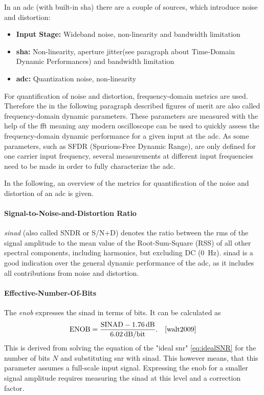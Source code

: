 In an \gls{adc} (with built-in \gls{sha}) there are a couple of sources, which introduce noise and distortion:
\begin{itemize}
	\item \textbf{Input Stage:} Wideband noise, non-linearity and bandwidth limitation
	\item \textbf{\gls{sha}:} Non-linearity, aperture jitter(see paragraph about Time-Domain Dynamic Performances)  and bandwidth limitation
	\item \textbf{\gls{adc}:} Quantization noise, non-linearity
\end{itemize}

For quantification of noise and distortion, frequency-domain metrics are used. 
Therefore the in the following paragraph described figures of merit are also called frequency-domain dynamic parameters. 
These parameters are measured with the help of the \gls{fft} meaning any modern oscilloscope can be used to quickly assess the frequency-domain dynamic performance for a given input at the \gls{adc}.
As some parameters, such as SFDR (Spurious-Free Dynamic Range), are only defined for one carrier input frequency, several measurements at different input frequencies need to be made in order to fully characterize the \gls{adc}.

In the following, an overview of the metrics for quantification of the noise and distortion of an \gls{adc} is given. 

\paragraph{Signal-to-Noise-and-Distortion Ratio}
\textit{\gls{sinad}} (also called SNDR or S/N+D) denotes the ratio between the \gls{rms} of the signal amplitude to the mean value of the Root-Sum-Square (RSS) of all other spectral components, including harmonics, but excluding  DC (\SI{0}{\hertz}). \gls{sinad} is a good indication over the general dynamic performance of the \gls{adc}, as it includes all contributions from noise and distortion.

\paragraph{Effective-Number-Of-Bits}
The \textit{\gls{enob}} expresses the \gls{sinad} in terms of bits. It can be calculated as
\begin{equation}
	\text{ENOB} = \frac{\text{SINAD}-\SI{1.76}{\decibel}}{\SI{6.02}{\decibel}/\text{bit}}. \quad \cite{walt2009}
\end{equation}
This is derived from solving the equation of the "ideal \gls{snr}" \autoref{eq:idealSNR} for the number of bits $N$ and substituting \gls{snr} with \gls{sinad}. This however means, that this parameter assumes a full-scale input signal. Expressing the \gls{enob} for a smaller signal amplitude requires measuring the \gls{sinad} at this level and a correction factor. \cite{walt}

